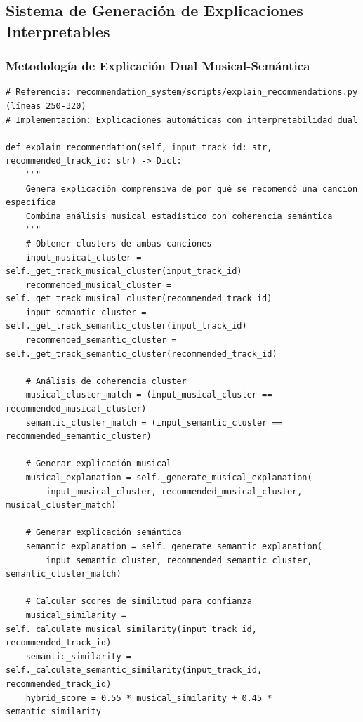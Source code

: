 \documentclass[12pt,a4paper]{article}
\begin{document}
\subsection{Sistema de Generación de Explicaciones Interpretables}

\subsubsection{Metodología de Explicación Dual Musical-Semántica}

\begin{lstlisting}[caption={Generación Automática de Explicaciones Comprensivas}]
# Referencia: recommendation_system/scripts/explain_recommendations.py (líneas 250-320)
# Implementación: Explicaciones automáticas con interpretabilidad dual

def explain_recommendation(self, input_track_id: str, recommended_track_id: str) -> Dict:
    """
    Genera explicación comprensiva de por qué se recomendó una canción específica
    Combina análisis musical estadístico con coherencia semántica
    """
    # Obtener clusters de ambas canciones
    input_musical_cluster = self._get_track_musical_cluster(input_track_id)
    recommended_musical_cluster = self._get_track_musical_cluster(recommended_track_id)
    input_semantic_cluster = self._get_track_semantic_cluster(input_track_id)
    recommended_semantic_cluster = self._get_track_semantic_cluster(recommended_track_id)

    # Análisis de coherencia cluster
    musical_cluster_match = (input_musical_cluster == recommended_musical_cluster)
    semantic_cluster_match = (input_semantic_cluster == recommended_semantic_cluster)

    # Generar explicación musical
    musical_explanation = self._generate_musical_explanation(
        input_musical_cluster, recommended_musical_cluster, musical_cluster_match)

    # Generar explicación semántica
    semantic_explanation = self._generate_semantic_explanation(
        input_semantic_cluster, recommended_semantic_cluster, semantic_cluster_match)

    # Calcular scores de similitud para confianza
    musical_similarity = self._calculate_musical_similarity(input_track_id, recommended_track_id)
    semantic_similarity = self._calculate_semantic_similarity(input_track_id, recommended_track_id)
    hybrid_score = 0.55 * musical_similarity + 0.45 * semantic_similarity


\end{lstlisting}
\end{document}
